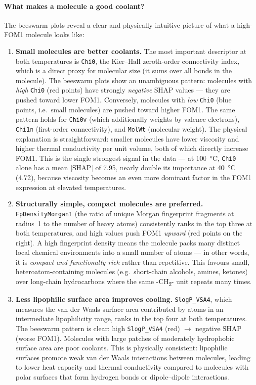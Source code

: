 \documentclass[11pt,a4paper]{article}
\begin{document}
\paragraph{What makes a molecule a good coolant?}
The beeswarm plots reveal a clear and physically intuitive picture of what a high-FOM1 molecule looks like:

\begin{enumerate}
    \item \textbf{Small molecules are better coolants.} The most important descriptor at both temperatures is \texttt{Chi0}, the Kier--Hall zeroth-order connectivity index, which is a direct proxy for molecular size (it sums over all bonds in the molecule). The beeswarm plots show an unambiguous pattern: molecules with \emph{high} \texttt{Chi0} (red points) have strongly \emph{negative} SHAP values --- they are pushed toward lower FOM1. Conversely, molecules with \emph{low} \texttt{Chi0} (blue points, i.e.\ small molecules) are pushed toward higher FOM1. The same pattern holds for \texttt{Chi0v} (which additionally weights by valence electrons), \texttt{Chi1n} (first-order connectivity), and \texttt{MolWt} (molecular weight). The physical explanation is straightforward: smaller molecules have lower viscosity and higher thermal conductivity per unit volume, both of which directly increase FOM1. This is the single strongest signal in the data --- at \SI{100}{\degreeCelsius}, \texttt{Chi0} alone has a mean $|\text{SHAP}|$ of 7.95, nearly double its importance at \SI{40}{\degreeCelsius} (4.72), because viscosity becomes an even more dominant factor in the FOM1 expression at elevated temperatures.

    \item \textbf{Structurally simple, compact molecules are preferred.} \texttt{FpDensityMorgan1} (the ratio of unique Morgan fingerprint fragments at radius~1 to the number of heavy atoms) consistently ranks in the top three at both temperatures, and high values push FOM1 \emph{upward} (red points on the right). A high fingerprint density means the molecule packs many distinct local chemical environments into a small number of atoms --- in other words, it is \emph{compact and functionally rich} rather than repetitive. This favours small, heteroatom-containing molecules (e.g.\ short-chain alcohols, amines, ketones) over long-chain hydrocarbons where the same \textrm{-CH\textsubscript{2}-} unit repeats many times.

    \item \textbf{Less lipophilic surface area improves cooling.} \texttt{SlogP\_VSA4}, which measures the van der Waals surface area contributed by atoms in an intermediate lipophilicity range, ranks in the top four at both temperatures. The beeswarm pattern is clear: high \texttt{SlogP\_VSA4} (red) $\rightarrow$ negative SHAP (worse FOM1). Molecules with large patches of moderately hydrophobic surface area are poor coolants. This is physically consistent: lipophilic surfaces promote weak van der Waals interactions between molecules, leading to lower heat capacity and thermal conductivity compared to molecules with polar surfaces that form hydrogen bonds or dipole--dipole interactions.


\end{enumerate}
\end{document}
